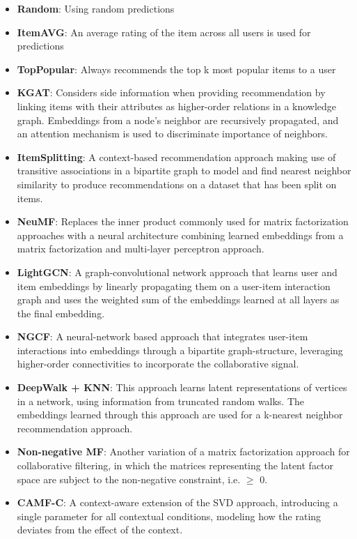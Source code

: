\begin{itemize}
    \item \textbf{Random}: Using random predictions
    \item \textbf{ItemAVG}: An average rating of the item across all users is used for predictions
    \item \textbf{TopPopular}: Always recommends the top k most popular items to a user
    \item \textbf{KGAT}: Considers side information when providing recommendation by linking items with their attributes as higher-order relations in a knowledge graph. Embeddings from a node's neighbor are recursively propagated, and an attention mechanism is used to discriminate importance of neighbors.
    \item \textbf{ItemSplitting}: A context-based recommendation approach making use of transitive associations in a bipartite graph to model and find nearest neighbor similarity to produce recommendations on a dataset that has been split on items.
    \item \textbf{NeuMF}: Replaces the inner product commonly used for matrix factorization approaches with a neural architecture combining learned embeddings from a matrix factorization and multi-layer perceptron approach.
    \item \textbf{LightGCN}: A graph-convolutional network approach that learns user and item embeddings by linearly propagating them on a user-item interaction graph and uses the weighted sum of the embeddings learned at all layers as the final embedding.
    \item \textbf{NGCF}: A neural-network based approach that integrates user-item interactions into embeddings through a bipartite graph-structure, leveraging higher-order connectivities to incorporate the collaborative signal.
    \item \textbf{DeepWalk + KNN}: This approach learns latent representations of vertices in a network, using information from truncated random walks. The embeddings learned through this approach are used for a k-nearest neighbor recommendation approach.
    \item \textbf{Non-negative MF}: Another variation of a matrix factorization approach for collaborative filtering, in which the matrices representing the latent factor space are subject to the non-negative constraint, i.e. $\geq$ 0.
    \item \textbf{CAMF-C}: A context-aware extension of the SVD approach, introducing a single parameter for all contextual conditions, modeling how the rating deviates from the effect of the context.

\end{itemize}
